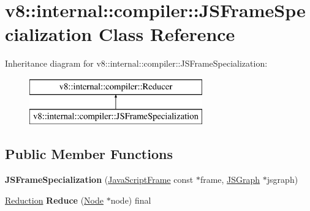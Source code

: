 \hypertarget{classv8_1_1internal_1_1compiler_1_1_j_s_frame_specialization}{}\section{v8\+:\+:internal\+:\+:compiler\+:\+:J\+S\+Frame\+Specialization Class Reference}
\label{classv8_1_1internal_1_1compiler_1_1_j_s_frame_specialization}
Inheritance diagram for v8\+:\+:internal\+:\+:compiler\+:\+:J\+S\+Frame\+Specialization\+:\begin{figure}[H]
\begin{center}
\leavevmode
\includegraphics[height=2.000000cm]{classv8_1_1internal_1_1compiler_1_1_j_s_frame_specialization}
\end{center}
\end{figure}
\subsection*{Public Member Functions}
\begin{DoxyCompactItemize}
\item 
{\bfseries J\+S\+Frame\+Specialization} (\hyperlink{classv8_1_1internal_1_1_java_script_frame}{Java\+Script\+Frame} const $\ast$frame, \hyperlink{classv8_1_1internal_1_1compiler_1_1_j_s_graph}{J\+S\+Graph} $\ast$jsgraph)\hypertarget{classv8_1_1internal_1_1compiler_1_1_j_s_frame_specialization_a3c9acc810796c4952c1ad9e49092b6f2}{}\label{classv8_1_1internal_1_1compiler_1_1_j_s_frame_specialization_a3c9acc810796c4952c1ad9e49092b6f2}

\item 
\hyperlink{classv8_1_1internal_1_1compiler_1_1_reduction}{Reduction} {\bfseries Reduce} (\hyperlink{classv8_1_1internal_1_1compiler_1_1_node}{Node} $\ast$node) final\hypertarget{classv8_1_1internal_1_1compiler_1_1_j_s_frame_specialization_a44ed04a38d8ce356688dee2c5cb273ba}{}\label{classv8_1_1internal_1_1compiler_1_1_j_s_frame_specialization_a44ed04a38d8ce356688dee2c5cb273ba}

\end{DoxyCompactItemize}
